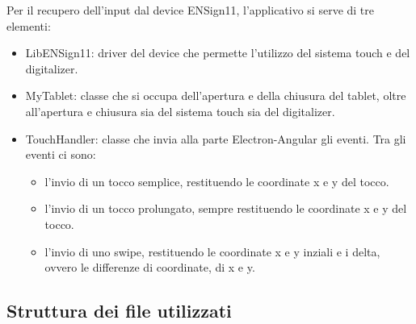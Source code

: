 Per il recupero dell'input dal device ENSign11, l'applicativo si serve di tre elementi:
\begin{itemize}
    \item LibENSign11: driver del device che permette l'utilizzo del sistema touch e del digitalizer.
    \item MyTablet: classe che si occupa dell'apertura e della chiusura del tablet, oltre all'apertura e chiusura sia del sistema touch sia del digitalizer.
    \item TouchHandler: classe che invia alla parte Electron-Angular gli eventi. Tra gli eventi ci sono: \begin{itemize}
        \item l'invio di un tocco semplice, restituendo le coordinate x e y del tocco.
        \item l'invio di un tocco prolungato, sempre restituendo le coordinate x e y del tocco.
        \item l'invio di uno swipe, restituendo le coordinate x e y inziali e i delta, ovvero le differenze di coordinate, di x e y. 
    \end{itemize}
\end{itemize}
\subsection{Struttura dei file utilizzati}